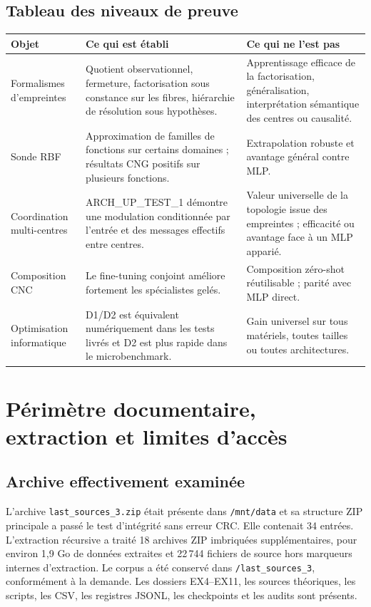\documentclass[11pt,a4paper]{article}
\newcommand{\code}[1]{\texttt{\small #1}}
\begin{document}
\subsection{Tableau des niveaux de preuve}

\begin{tabularx}{\textwidth}{P{3.3cm}YY}
\toprule
\textbf{Objet} & \textbf{Ce qui est établi} & \textbf{Ce qui ne l'est pas}\\
\midrule
Formalismes d'empreintes & Quotient observationnel, fermeture, factorisation sous constance sur les fibres, hiérarchie de résolution sous hypothèses. & Apprentissage efficace de la factorisation, généralisation, interprétation sémantique des centres ou causalité.\\
Sonde RBF & Approximation de familles de fonctions sur certains domaines ; résultats CNG positifs sur plusieurs fonctions. & Extrapolation robuste et avantage général contre MLP.\\
Coordination multi-centres & ARCH\_UP\_TEST\_1 démontre une modulation conditionnée par l'entrée et des messages effectifs entre centres. & Valeur universelle de la topologie issue des empreintes ; efficacité ou avantage face à un MLP apparié.\\
Composition CNC & Le fine-tuning conjoint améliore fortement les spécialistes gelés. & Composition zéro-shot réutilisable ; parité avec MLP direct.\\
Optimisation informatique & D1/D2 est équivalent numériquement dans les tests livrés et D2 est plus rapide dans le microbenchmark. & Gain universel sur tous matériels, toutes tailles ou toutes architectures.\\
\bottomrule
\end{tabularx}

\section{Périmètre documentaire, extraction et limites d'accès}

\subsection{Archive effectivement examinée}

L'archive \code{last\_sources\_3.zip} était présente dans \code{/mnt/data} et sa structure ZIP principale a passé le test d'intégrité sans erreur CRC. Elle contenait 34 entrées. L'extraction récursive a traité 18 archives ZIP imbriquées supplémentaires, pour environ 1,9 Go de données extraites et 22\,744 fichiers de source hors marqueurs internes d'extraction. Le corpus a été conservé dans \code{/last\_sources\_3}, conformément à la demande. Les dossiers EX4--EX11, les sources théoriques, les scripts, les CSV, les registres JSONL, les checkpoints et les audits sont présents.
\end{document}
